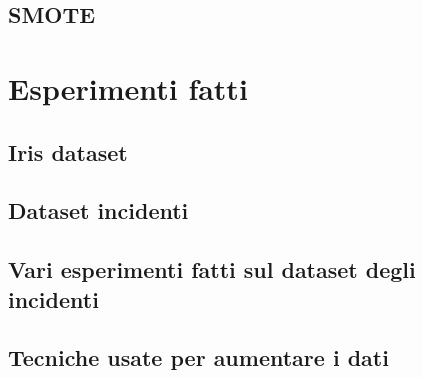 \documentclass[12pt, twoside, letterpaper]{article}
\begin{document}
		\subsection{SMOTE}
	\section{Esperimenti fatti}
		\subsection{Iris dataset}
		\subsection{Dataset incidenti}
		\subsection{Vari esperimenti fatti sul dataset degli incidenti}
		\subsection{Tecniche usate per aumentare i dati}

				
\end{document}
